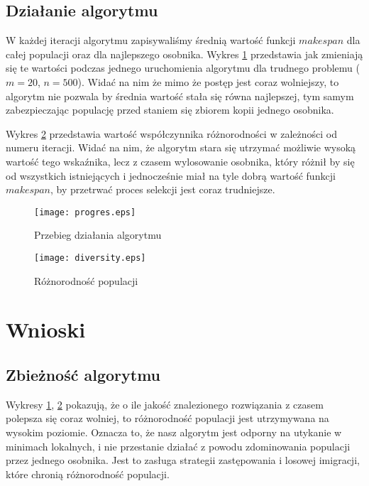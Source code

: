 \documentclass[11pt, a4wide]{article}
\begin{document}
\subsection{Działanie algorytmu}
W każdej iteracji algorytmu zapisywaliśmy średnią wartość funkcji $makespan$ dla całej populacji
oraz dla najlepszego osobnika. Wykres \ref{progress} przedstawia jak zmieniają się te wartości 
podczas jednego uruchomienia algorytmu dla trudnego problemu ($m = 20$, $n = 500$). Widać na nim
że mimo że postęp jest coraz wolniejszy, to algorytm nie pozwala by średnia wartość stała się równa
najlepszej, tym samym zabezpieczając populację przed staniem się zbiorem kopii jednego osobnika.

Wykres \ref{diversity} przedstawia wartość współczynnika różnorodności w zależności od numeru iteracji.
Widać na nim, że algorytm stara się utrzymać możliwie wysoką wartość tego wskaźnika, lecz z czasem
wylosowanie osobnika, który różnił by się od wszystkich istniejących i jednocześnie miał na tyle
dobrą wartość funkcji $makespan$, by przetrwać proces selekcji jest coraz trudniejsze.

\begin{figure}[H]
\caption{Przebieg działania algorytmu}
\label{progress}
\begin{center}
  \texttt{[image: progres.eps]}
\end{center}
\end{figure}


\begin{figure}[H]
\caption{Różnorodność populacji}
\label{diversity}
\begin{center}
  \texttt{[image: diversity.eps]}
\end{center}
\end{figure}





\section{Wnioski}  
\subsection{Zbieżność algorytmu}
Wykresy \ref{progress}, \ref{diversity} pokazują, że o ile jakość znalezionego rozwiązania z czasem polepsza się 
coraz wolniej, to różnorodność populacji jest utrzymywana na wysokim poziomie. Oznacza to, że nasz algorytm jest odporny na utykanie
w minimach lokalnych, i nie przestanie działać z powodu zdominowania populacji przez jednego osobnika. Jest to
zasługa strategii zastępowania i losowej imigracji, które chronią różnorodność populacji.
\end{document}
